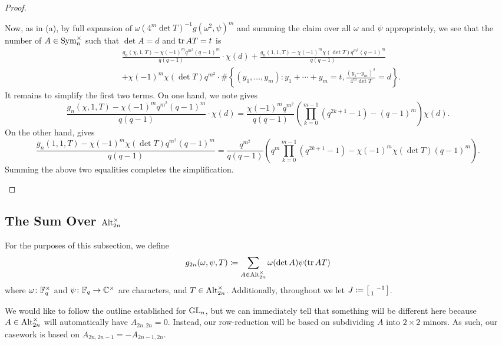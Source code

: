 \begin{proof}
\begin{enumerate}[label=(\alph*)]
        Now, as in (a), by full expansion of $\omega\left(4^m\det T\right)^{-1}g\left(\omega^2,\psi\right)^m$ and summing the claim over all $\omega$ and $\psi$ appropriately, we see that the number of $A\in\operatorname{Sym}_n^\times$ such that $\det A=d$ and $\operatorname{tr} AT=t$ is
        \begin{align*}
            &\frac{g_n(\chi,1,T)-\chi(-1)^mq^{m^2}(q-1)^m}{q(q-1)}\cdot\chi(d)+\frac{g_n(1,1,T)-\chi(-1)^m\chi(\det T)q^{m^2}(q-1)^m}{q(q-1)}\\
            &+\chi(-1)^m\chi(\det T)q^{m^2}\cdot\#\left\{(y_1,\ldots,y_m):y_1+\cdots+y_m=t,\frac{(y_1\cdots y_m)^2}{4^m\det T}=d\right\}.
        \end{align*}
        It remains to simplify the first two terms. On one hand, we note  gives
        \[\frac{g_n(\chi,1,T)-\chi(-1)^mq^{m^2}(q-1)^m}{q(q-1)}\cdot\chi(d)=\frac{\chi(-1)^mq^{m^2}}{q(q-1)}\left(\prod_{k=0}^{m-1}\left(q^{2k+1}-1\right)-(q-1)^m\right)\chi(d).\]
        On the other hand,  gives
        \[\frac{g_n(1,1,T)-\chi(-1)^m\chi(\det T)q^{m^2}(q-1)^m}{q(q-1)}=\frac{q^{m^2}}{q(q-1)}\left(q^m\prod_{k=0}^{m-1}\left(q^{2k+1}-1\right)-\chi(-1)^m\chi(\det T)(q-1)^m\right).\]
        Summing the above two equalities completes the simplification.
        \qedhere
    \end{enumerate}
\end{proof}

\subsection{The Sum Over \texorpdfstring{$\operatorname{Alt}_{2n}^\times$}{ Alt}}
For the purposes of this subsection, we define
\[g_{2n}(\omega,\psi,T)\coloneqq\sum_{A\in\operatorname{Alt}_{2n}^\times}\omega(\det A)\psi(\operatorname{tr} AT)\]
where $\omega\colon\mathbb F_q^\times$ and $\psi\colon\mathbb F_q\to\mathbb C^\times$ are characters, and $T\in\operatorname{Alt}_{2n}^\times$. Additionally, throughout we let $J\coloneqq\begin{bsmallmatrix}
    & -1 \\ 1
\end{bsmallmatrix}$.

We would like to follow the outline established for $\mathrm{GL}_n$, but we can immediately tell that something will be different here because $A\in\operatorname{Alt}_{2n}^\times$ will automatically have $A_{2n,2n}=0$. Instead, our row-reduction will be based on subdividing $A$ into $2\times2$ minors. As such, our casework is based on $A_{2n,2n-1}=-A_{2n-1,2n}$.


